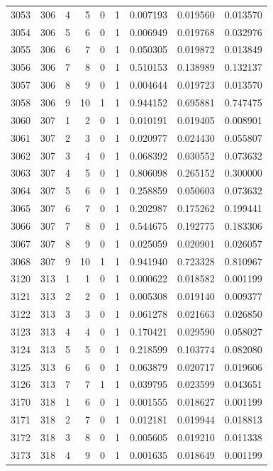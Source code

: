 \begin{longtable}{rrrrrrrrr}
3053 & 306 & 4 & 5 & 0 & 1 & 0.007193 & 0.019560 & 0.013570 \\
3054 & 306 & 5 & 6 & 0 & 1 & 0.006949 & 0.019768 & 0.032976 \\
3055 & 306 & 6 & 7 & 0 & 1 & 0.050305 & 0.019872 & 0.013849 \\
3056 & 306 & 7 & 8 & 0 & 1 & 0.510153 & 0.138989 & 0.132137 \\
3057 & 306 & 8 & 9 & 0 & 1 & 0.004644 & 0.019723 & 0.013570 \\
3058 & 306 & 9 & 10 & 1 & 1 & 0.944152 & 0.695881 & 0.747475 \\
3060 & 307 & 1 & 2 & 0 & 1 & 0.010191 & 0.019405 & 0.008901 \\
3061 & 307 & 2 & 3 & 0 & 1 & 0.020977 & 0.024430 & 0.055807 \\
3062 & 307 & 3 & 4 & 0 & 1 & 0.068392 & 0.030552 & 0.073632 \\
3063 & 307 & 4 & 5 & 0 & 1 & 0.806098 & 0.265152 & 0.300000 \\
3064 & 307 & 5 & 6 & 0 & 1 & 0.258859 & 0.050603 & 0.073632 \\
3065 & 307 & 6 & 7 & 0 & 1 & 0.202987 & 0.175262 & 0.199441 \\
3066 & 307 & 7 & 8 & 0 & 1 & 0.544675 & 0.192775 & 0.183306 \\
3067 & 307 & 8 & 9 & 0 & 1 & 0.025059 & 0.020901 & 0.026057 \\
3068 & 307 & 9 & 10 & 1 & 1 & 0.941940 & 0.723328 & 0.810967 \\
3120 & 313 & 1 & 1 & 0 & 1 & 0.000622 & 0.018582 & 0.001199 \\
3121 & 313 & 2 & 2 & 0 & 1 & 0.005308 & 0.019140 & 0.009377 \\
3122 & 313 & 3 & 3 & 0 & 1 & 0.061278 & 0.021663 & 0.026850 \\
3123 & 313 & 4 & 4 & 0 & 1 & 0.170421 & 0.029590 & 0.058027 \\
3124 & 313 & 5 & 5 & 0 & 1 & 0.218599 & 0.103774 & 0.082080 \\
3125 & 313 & 6 & 6 & 0 & 1 & 0.063879 & 0.020717 & 0.019606 \\
3126 & 313 & 7 & 7 & 1 & 1 & 0.039795 & 0.023599 & 0.043651 \\
3170 & 318 & 1 & 6 & 0 & 1 & 0.001555 & 0.018627 & 0.001199 \\
3171 & 318 & 2 & 7 & 0 & 1 & 0.012181 & 0.019944 & 0.018813 \\
3172 & 318 & 3 & 8 & 0 & 1 & 0.005605 & 0.019210 & 0.011338 \\
3173 & 318 & 4 & 9 & 0 & 1 & 0.001635 & 0.018649 & 0.001199 \\

\end{longtable}
